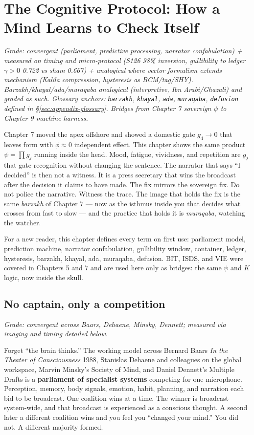 \chapter{The Cognitive Protocol: How a Mind Learns to Check Itself}
\label{ch:cognitive}

\textit{Grade: convergent (parliament, predictive processing, narrator confabulation) + measured on timing and micro-protocol (S126 98\% inversion, gullibility to ledger $\gamma>0$ 0.722 vs sham 0.667) + analogical where vector formalism extends mechanism (Kalila compression, hysteresis as BCM/tag/SHY). Barzakh/khayal/ada/muraqaba analogical (interpretive, Ibn Arabi/Ghazali) and graded as such. Glossary anchors: \texttt{barzakh}, \texttt{khayal}, \texttt{ada}, \texttt{muraqaba}, \texttt{defusion} defined in \S\ref{sec:appendix-glossary}. Bridges from Chapter 7 sovereign $\psi$ to Chapter 9 machine harness.}

Chapter 7 moved the apex offshore and showed a domestic gate $g_4 \to 0$ that leaves form with $\phi \approx 0$ independent effect. This chapter shows the same product $\psi = \prod g_j$ running inside the head. Mood, fatigue, vividness, and repetition are $g_j$ that gate recognition without changing the sentence. The narrator that says ``I decided'' is then not a witness. It is a press secretary that wins the broadcast after the decision it claims to have made. The fix mirrors the sovereign fix. Do not police the narrative. Witness the trace. The image that holds the fix is the same \textit{barzakh} of Chapter 7 --- now as the isthmus inside you that decides what crosses from fast to slow --- and the practice that holds it is \textit{muraqaba}, watching the watcher.

For a new reader, this chapter defines every term on first use: parliament model, prediction machine, narrator confabulation, gullibility window, container, ledger, hysteresis, barzakh, khayal, ada, muraqaba, defusion. BIT, ISDS, and VIE were covered in Chapters 5 and 7 and are used here only as bridges: the same $\psi$ and $K$ logic, now inside the skull.

\section{No captain, only a competition}

\textit{Grade: convergent across Baars, Dehaene, Minsky, Dennett; measured via imaging and timing detailed below.}

Forget ``the brain thinks.'' The working model across Bernard Baars \textit{In the Theater of Consciousness} 1988, Stanislas Dehaene and colleagues on the global workspace, Marvin Minsky's Society of Mind, and Daniel Dennett's Multiple Drafts is a \textbf{parliament of specialist systems} competing for one microphone. Perception, memory, body signals, emotion, habit, planning, and narration each bid to be broadcast. One coalition wins at a time. The winner is broadcast system-wide, and that broadcast is experienced as a conscious thought. A second later a different coalition wins and you feel you ``changed your mind.'' You did not. A different majority formed.

